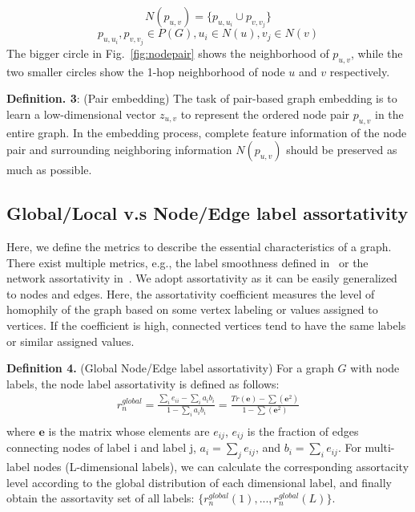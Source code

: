 \documentclass[10pt,journal,compsoc]{IEEEtran}
\begin{document}
    $$N(p_{u,v})= \{p_{u,u_i} \cup p_{v,v_j}\}$$
    $$p_{u,u_i},p_{v,v_j} \in P(G), u_i \in N(u),v_j \in N(v) $$
The bigger circle in Fig.~\ref{fig:nodepair} shows the neighborhood of $p_{u,v}$, while the two smaller circles show the 1-hop neighborhood of node $u$ and $v$ respectively. 






\noindent \textbf{Definition. 3}: (Pair embedding)  The task of pair-based graph embedding is to learn a low-dimensional vector $z_{u,v}$ to represent the ordered node pair $p_{u,v}$ in the entire graph. In the embedding process, complete feature information of the node pair and surrounding neighboring information $N(p_{u,v})$ should be preserved as much as possible.


\subsection{Global/Local v.s Node/Edge label assortativity}

Here, we define the metrics to describe the essential characteristics of a graph. There exist multiple metrics, e.g., the label smoothness defined in~\cite{Hou20Measuring} or the network assortativity in~\cite{Newman2003}. We adopt assortativity as it can be easily generalized to nodes and edges. Here, the assortativity coefficient measures the level of homophily of the graph based on some vertex labeling or values assigned to vertices. If the coefficient is high, connected vertices tend to have the same labels or similar assigned values.




\noindent\textbf{Definition 4.} (Global Node/Edge label assortativity) For a graph $G$ with node labels, the node label assortativity is defined as follows:
\begin{equation}
\begin{aligned}
    r_n^{global} = \frac{\sum_{i}e_{ii}-\sum_{i}a_{i}b_{i}}{1-\sum_{i}a_{i}b_{i}} =  \frac{Tr(\textbf{e})-\sum(\textbf{e}^2)}{1-\sum(\textbf{e}^2)}\\
\end{aligned}
\end{equation}
    where $\textbf{e}$ is the matrix whose elements are $e_{ij}$, $e_{ij}$ is the fraction of edges connecting nodes of label i and label j, $a_i = \sum_{j}e_{ij}$, and $b_i = \sum_{i}e_{ij}$. For multi-label nodes (L-dimensional labels), we can calculate the corresponding assortacity level according to the global distribution of each dimensional label, and finally obtain the assortavity set of all labels: $\{r_n^{global}(1),...,r_n^{global}(L)\}$.
     
\end{document}
